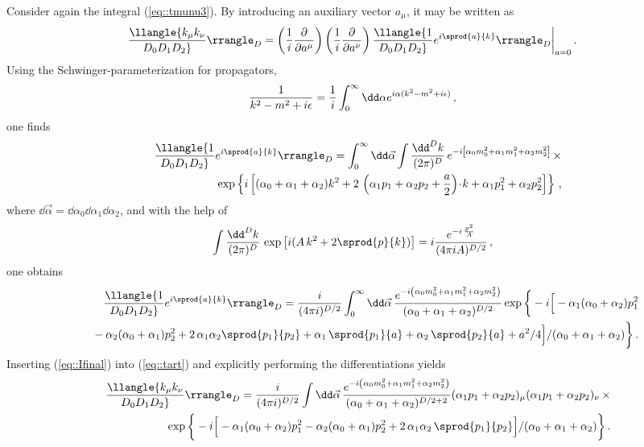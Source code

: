 Consider again the integral (\ref{eq::tmunu3}). By introducing an
auxiliary vector $a_\mu$, it may be written as
%
\begin{eqnarray}\label{eq::tart}
\llangle {k_\mu k_\nu\over D_0 D_1 D_2}\rrangle_D =
\left({1\over i}{\partial\over \partial a^\mu}\right)
\left({1\over i}{\partial\over \partial a^\nu}\right)
\llangle {1\over D_0 D_1 D_2} e^{i\sprod{a}{k}}\rrangle_D \bigg|_{a=0}\,.
\end{eqnarray}
%
Using the Schwinger-parameterization for propagators,
%
\begin{equation}
{1\over k^2-m^2+i\epsilon} = {1\over i}\int_0^\infty\dd\alpha
e^{i\alpha(k^2-m^2+i\epsilon)}\,,
\end{equation}
%
one finds
%
\begin{eqnarray}
  && \llangle {1\over D_0 D_1 D_2} e^{i\sprod{a}{k}}\rrangle_D =
  \int_0^\infty\dd\vec{\alpha} \int{\dd^D k\over (2\pi)^D}
  \,e^{-i\left[\alpha_0m_0^2 + \alpha_1m_1^2 + \alpha_2m_2^2\right]}\,
  \times\nonumber\\&&\mbox{\hspace{1ex}} \exp\left\{i\left[(\alpha_0 +
  \alpha_1 + \alpha_2)k^2 + 2\,\left(\alpha_1 p_1 + \alpha_2 p_2 +
  {a\over 2}\right)\!\cdot\!k + \alpha_1 p_1^2 + \alpha_2
  p_2^2\right]\right\}\,,
\end{eqnarray}
%
where $\dd\vec\alpha = \dd\alpha_0\dd\alpha_1\dd\alpha_2$, and with the
help of
%
\begin{equation}
\int {\dd^D k\over (2\pi)^D}\,\exp\left[i(A\,k^2 + 2\sprod{p}{k})\right] =
i{e^{-i\,{p^2\over A}}\over (4\pi i A)^{D/2}}\,,
\end{equation}
%
one obtains
%
\begin{eqnarray}\label{eq::Ifinal}
&& \llangle {1\over D_0 D_1 D_2} e^{i\sprod{a}{k}}\rrangle_D =
{i\over (4\pi i)^{D/2}}\int_0^\infty \dd\vec\alpha \,
{e^{-i\left(\alpha_0m_0^2 + \alpha_1m_1^2 + \alpha_2m_2^2\right)} \over 
  (\alpha_0 + \alpha_1 + \alpha_2)^{D/2}}  
\exp\bigg\{-i\Big[-\alpha_1(\alpha_0 + \alpha_2)p_1^2 
\nonumber\\&& \mbox{\hspace{3ex}} -
  \alpha_2(\alpha_0 + \alpha_1)p_2^2 +
  2\,\alpha_1\alpha_2
  \sprod{p_1}{p_2} + \alpha_1\,\sprod{p_1}{a} +
  \alpha_2\,\sprod{p_2}{a} + a^2/4\Big]/(\alpha_0 
  + \alpha_1 + \alpha_2)\bigg\}\,.
\end{eqnarray}
%
Inserting (\ref{eq::Ifinal}) into (\ref{eq::tart}) and explicitly
performing the differentiations yields
%
\begin{eqnarray}
&&\llangle{k_\mu k_\nu\over D_0 D_1 D_2}\rrangle_D =
{i\over (4\pi i)^{D/2}}\int\dd \vec\alpha\,
{e^{-i\left(\alpha_0m_0^2 + \alpha_1m_1^2 + \alpha_2m_2^2\right)}
  \over
  (\alpha_0 + \alpha_1 + \alpha_2)^{D/2+2}}
(\alpha_1 p_1 + \alpha_2 p_2)_\mu (\alpha_1 p_1 + \alpha_2 p_2)_\nu
\, \times\nonumber\\&&\mbox{\hspace{6ex}}
\exp\bigg\{-i\Big[-\alpha_1(\alpha_0 + \alpha_2)p_1^2 -
\alpha_2(\alpha_0 + \alpha_1)p_2^2 + 2\,\alpha_1\alpha_2\,
  \sprod{p_1}{p_2} \Big]/(\alpha_0 + \alpha_1 + \alpha_2)\bigg\}\,.
\label{eq::alpha-param}
\end{eqnarray}
